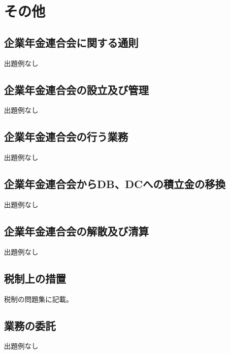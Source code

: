 \section{その他}

\subsection{企業年金連合会に関する通則}

出題例なし

\newpage

\subsection{企業年金連合会の設立及び管理}

出題例なし

\newpage

\subsection{企業年金連合会の行う業務}

出題例なし

\newpage

\subsection{企業年金連合会からDB、DCへの積立金の移換}

出題例なし

\newpage

\subsection{企業年金連合会の解散及び清算}

出題例なし

\newpage

\subsection{税制上の措置}

税制の問題集に記載。

\newpage

\subsection{業務の委託}

出題例なし

\newpage

